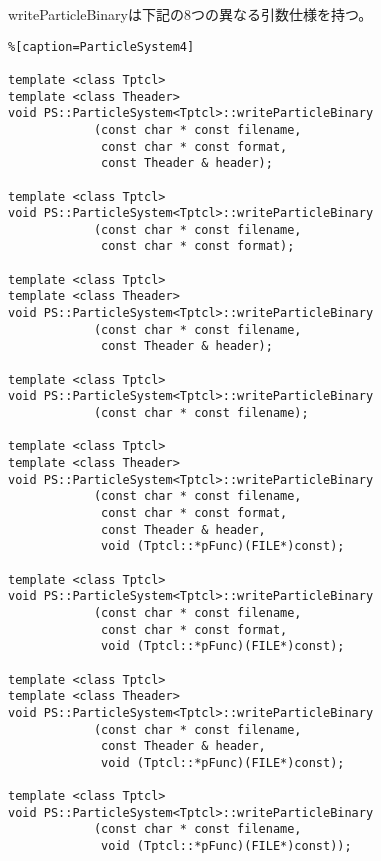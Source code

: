 writeParticleBinaryは下記の8つの異なる引数仕様を持つ。
\begin{lstlisting}%[caption=ParticleSystem4]

template <class Tptcl>
template <class Theader>
void PS::ParticleSystem<Tptcl>::writeParticleBinary
            (const char * const filename,
             const char * const format,
             const Theader & header);
             
template <class Tptcl>
void PS::ParticleSystem<Tptcl>::writeParticleBinary
            (const char * const filename,
             const char * const format);

template <class Tptcl>
template <class Theader>
void PS::ParticleSystem<Tptcl>::writeParticleBinary
            (const char * const filename,
             const Theader & header);

template <class Tptcl>
void PS::ParticleSystem<Tptcl>::writeParticleBinary
            (const char * const filename);

template <class Tptcl>
template <class Theader>
void PS::ParticleSystem<Tptcl>::writeParticleBinary
            (const char * const filename,
             const char * const format,
             const Theader & header,
             void (Tptcl::*pFunc)(FILE*)const);

template <class Tptcl>
void PS::ParticleSystem<Tptcl>::writeParticleBinary
            (const char * const filename,
             const char * const format,
             void (Tptcl::*pFunc)(FILE*)const);

template <class Tptcl>
template <class Theader>
void PS::ParticleSystem<Tptcl>::writeParticleBinary
            (const char * const filename,
             const Theader & header,
             void (Tptcl::*pFunc)(FILE*)const);

template <class Tptcl>             
void PS::ParticleSystem<Tptcl>::writeParticleBinary
            (const char * const filename,
             void (Tptcl::*pFunc)(FILE*)const));
\end{lstlisting}

